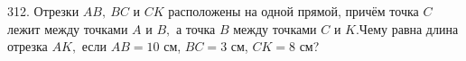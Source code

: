 312. Отрезки $AB,\ BC$ и $CK$ расположены на одной прямой, причём точка $C$ лежит между точками $A$ и $B,$ а точка $B$ между точками $C$ и $K.$Чему равна длина отрезка $AK,$ если $AB=10$ см, $BC=3$ см, $CK=8$ см?\\
